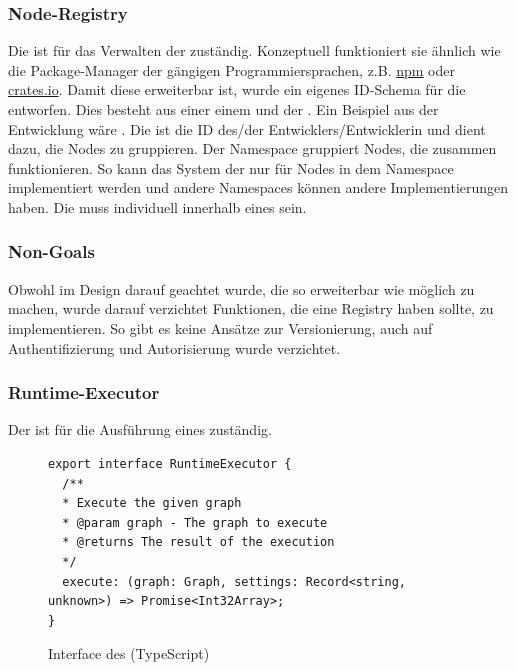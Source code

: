 \documentclass[ngerman]{article}
\begin{document}
\subsubsection{Node-Registry}
\label{sec:node_registry}

Die  ist für das Verwalten der  zuständig. Konzeptuell funktioniert sie ähnlich wie die Package-Manager der gängigen Programmiersprachen, z.B. \href{https://www.npmjs.com/}{npm} oder \href{https://crates.io/}{crates.io}.
\br
Damit diese  erweiterbar ist, wurde ein eigenes ID-Schema für die  entworfen. Dies besteht aus einer  einem  und der . 
Ein Beispiel aus der Entwicklung wäre .
\br
Die  ist die ID des/der Entwicklers/Entwicklerin und dient dazu, die Nodes zu gruppieren. Der Namespace gruppiert Nodes, die zusammen funktionieren. So kann das System der  nur für Nodes in dem  Namespace implementiert werden und andere Namespaces können andere Implementierungen haben.
\br
Die  muss individuell innerhalb eines  sein. 

\subsubsection*{Non-Goals}
Obwohl im Design darauf geachtet wurde, die  so erweiterbar wie möglich zu machen, wurde darauf verzichtet Funktionen, die eine  Registry haben sollte, zu implementieren. So gibt es keine Ansätze zur Versionierung, auch auf Authentifizierung und Autorisierung wurde verzichtet.

\pagebreak

\subsubsection{Runtime-Executor}
\label{sec:runtime_executor}

Der  ist für die Ausführung eines  zuständig.

\begin{figure}[htbp]
  \begin{code}
    \begin{verbatim}
export interface RuntimeExecutor {
  /**
  * Execute the given graph
  * @param graph - The graph to execute
  * @returns The result of the execution
  */
  execute: (graph: Graph, settings: Record<string, unknown>) => Promise<Int32Array>;
}
    \end{verbatim}
  \end{code}
  \caption{Interface des  (TypeScript)}
  \label{fig:runtime_executor}
\end{figure}
\end{document}
